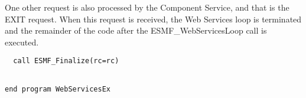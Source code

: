     One other request is also processed by the Component Service, and that is
    the EXIT request.  When this request is received, the Web Services loop
    is terminated and the remainder of the code after the ESMF\_WebServicesLoop
    call is executed. 

 \begin{verbatim}
  call ESMF_Finalize(rc=rc)
 
\end{verbatim}
 

 \begin{verbatim}
end program WebServicesEx
 
\end{verbatim}

\setlength{\parskip}{\oldparskip}
\setlength{\parindent}{\oldparindent}
\setlength{\baselineskip}{\oldbaselineskip}
